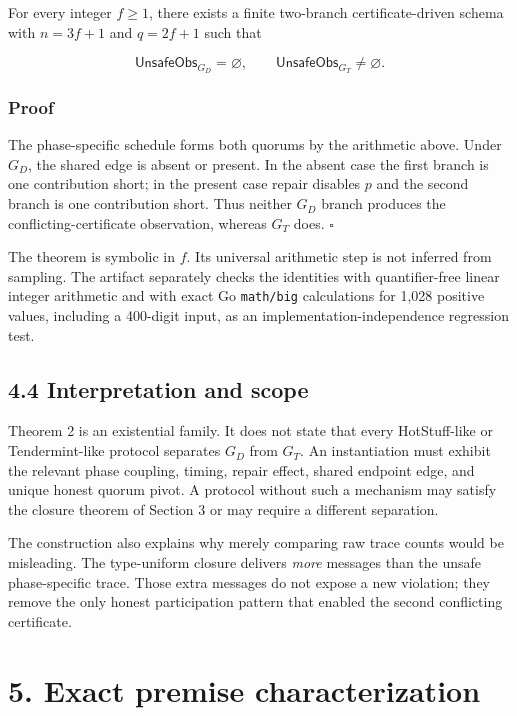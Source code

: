 \documentclass[10pt,a4paper]{article}
\begin{document}
For every integer \(f\geq1\), there exists a finite two-branch
certificate-driven schema with \(n=3f+1\) and \(q=2f+1\) such that

\[
\mathsf{UnsafeObs}_{G_D}=\varnothing,
\qquad
\mathsf{UnsafeObs}_{G_T}\neq\varnothing.
\]

\subsubsection{Proof}\label{proof-1}

The phase-specific schedule forms both quorums by the arithmetic above.
Under \(G_D\), the shared edge is absent or present. In the absent case
the first branch is one contribution short; in the present case repair
disables \(p\) and the second branch is one contribution short. Thus
neither \(G_D\) branch produces the conflicting-certificate observation,
whereas \(G_T\) does. \(\square\)

The theorem is symbolic in \(f\). Its universal arithmetic step is not
inferred from sampling. The artifact separately checks the identities
with quantifier-free linear integer arithmetic and with exact Go
\texttt{math/big} calculations for 1,028 positive values, including a
400-digit input, as an implementation-independence regression test.

\subsection{4.4 Interpretation and
scope}\label{interpretation-and-scope}

Theorem 2 is an existential family. It does not state that every
HotStuff-like or Tendermint-like protocol separates \(G_D\) from
\(G_T\). An instantiation must exhibit the relevant phase coupling,
timing, repair effect, shared endpoint edge, and unique honest quorum
pivot. A protocol without such a mechanism may satisfy the closure
theorem of Section 3 or may require a different separation.

The construction also explains why merely comparing raw trace counts
would be misleading. The type-uniform closure delivers \emph{more}
messages than the unsafe phase-specific trace. Those extra messages do
not expose a new violation; they remove the only honest participation
pattern that enabled the second conflicting certificate.

\section{5. Exact premise
characterization}\label{exact-premise-characterization}
\end{document}
